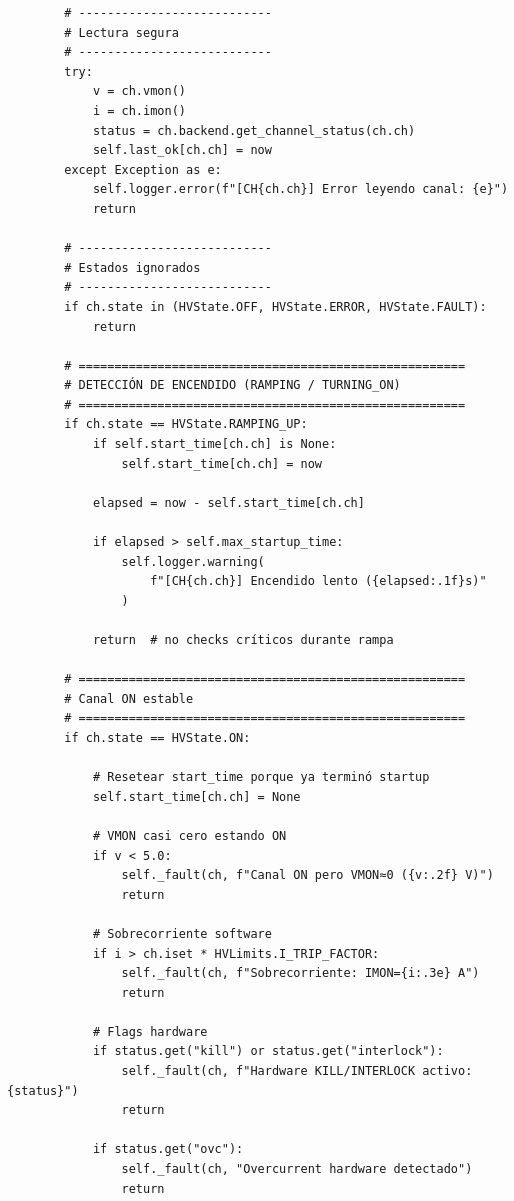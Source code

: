 \documentclass{article}
\begin{document}
\begin{lstlisting}
        # ---------------------------
        # Lectura segura
        # ---------------------------
        try:
            v = ch.vmon()
            i = ch.imon()
            status = ch.backend.get_channel_status(ch.ch)
            self.last_ok[ch.ch] = now
        except Exception as e:
            self.logger.error(f"[CH{ch.ch}] Error leyendo canal: {e}")
            return

        # ---------------------------
        # Estados ignorados
        # ---------------------------
        if ch.state in (HVState.OFF, HVState.ERROR, HVState.FAULT):
            return

        # ======================================================
        # DETECCIÓN DE ENCENDIDO (RAMPING / TURNING_ON)
        # ======================================================
        if ch.state == HVState.RAMPING_UP:
            if self.start_time[ch.ch] is None:
                self.start_time[ch.ch] = now

            elapsed = now - self.start_time[ch.ch]

            if elapsed > self.max_startup_time:
                self.logger.warning(
                    f"[CH{ch.ch}] Encendido lento ({elapsed:.1f}s)"
                )

            return  # no checks críticos durante rampa

        # ======================================================
        # Canal ON estable
        # ======================================================
        if ch.state == HVState.ON:

            # Resetear start_time porque ya terminó startup
            self.start_time[ch.ch] = None

            # VMON casi cero estando ON
            if v < 5.0:
                self._fault(ch, f"Canal ON pero VMON≈0 ({v:.2f} V)")
                return

            # Sobrecorriente software
            if i > ch.iset * HVLimits.I_TRIP_FACTOR:
                self._fault(ch, f"Sobrecorriente: IMON={i:.3e} A")
                return

            # Flags hardware
            if status.get("kill") or status.get("interlock"):
                self._fault(ch, f"Hardware KILL/INTERLOCK activo: {status}")
                return

            if status.get("ovc"):
                self._fault(ch, "Overcurrent hardware detectado")
                return


\end{lstlisting}
\end{document}
